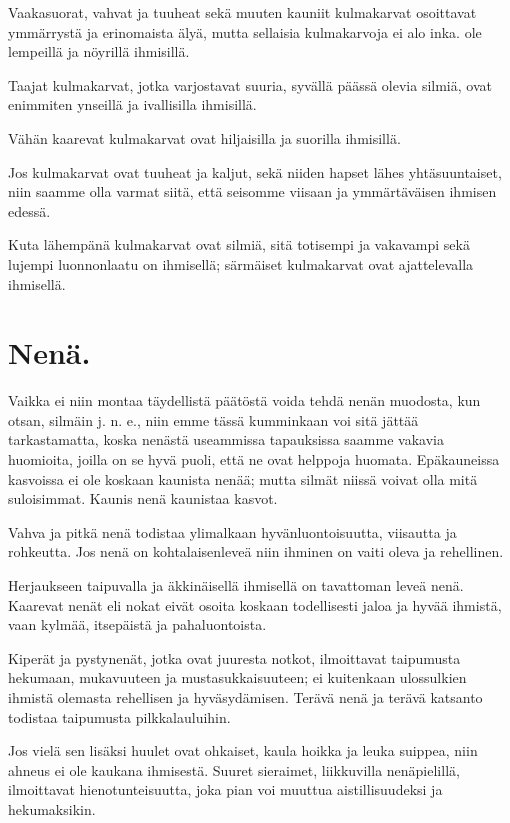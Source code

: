 \documentclass[11pt, twoside, finnish, a5paper]{book}
\begin{document}
Vaakasuorat, vahvat ja tuuheat sekä muuten
kauniit kulmakarvat osoittavat ymmärrystä ja erinomaista älyä,
mutta sellaisia kulmakarvoja ei alo inka. ole lempeillä
ja nöyrillä ihmisillä.

Taajat kulmakarvat, jotka varjostavat suuria,
syvällä päässä olevia silmiä, ovat enimmiten
ynseillä ja ivallisilla ihmisillä.

Vähän kaarevat kulmakarvat ovat hiljaisilla ja suorilla
ihmisillä.

Jos kulmakarvat ovat tuuheat ja kaljut, sekä niiden
hapset lähes yhtäsuuntaiset, niin saamme olla varmat
siitä, että seisomme viisaan ja ymmärtäväisen ihmisen
edessä.

Kuta lähempänä kulmakarvat ovat silmiä, sitä totisempi
ja vakavampi sekä lujempi luonnonlaatu on ihmisellä;
särmäiset kulmakarvat ovat ajattelevalla ihmisellä.


\chapter*{Nenä.}

Vaikka ei niin montaa täydellistä päätöstä voida tehdä
nenän muodosta, kun otsan, silmäin j. n. e., niin emme
tässä kumminkaan voi sitä jättää tarkastamatta, koska
nenästä useammissa tapauksissa saamme vakavia huomioita,
 joilla on se hyvä puoli, että ne ovat helppoja
huomata. Epäkauneissa kasvoissa ei ole koskaan
kaunista nenää; mutta silmät niissä voivat olla mitä
suloisimmat. Kaunis nenä kaunistaa kasvot.
 
Vahva ja pitkä nenä todistaa ylimalkaan
hyvänluontoisuutta, viisautta ja rohkeutta.
Jos nenä on kohtalaisenleveä niin ihminen on
vaiti oleva ja rehellinen.

Herjaukseen taipuvalla ja äkkinäisellä ihmisellä on
tavattoman leveä nenä. Kaarevat nenät eli nokat
eivät osoita koskaan todellisesti jaloa ja hyvää
ihmistä, vaan kylmää, itsepäistä ja pahaluontoista.

Kiperät ja pystynenät, jotka ovat juuresta notkot,
ilmoittavat taipumusta hekumaan, mukavuuteen ja
mustasukkaisuuteen; ei kuitenkaan ulossulkien ihmistä
olemasta rehellisen ja hyväsydämisen. Terävä nenä
ja terävä katsanto todistaa taipumusta pilkkalauluihin.

Jos vielä sen lisäksi huulet ovat ohkaiset,
kaula hoikka ja leuka suippea, niin ahneus ei ole
kaukana ihmisestä. Suuret sieraimet, liikkuvilla
nenäpielillä, ilmoittavat hienotunteisuutta,
joka pian voi muuttua aistillisuudeksi ja hekumaksikin.
\end{document}
